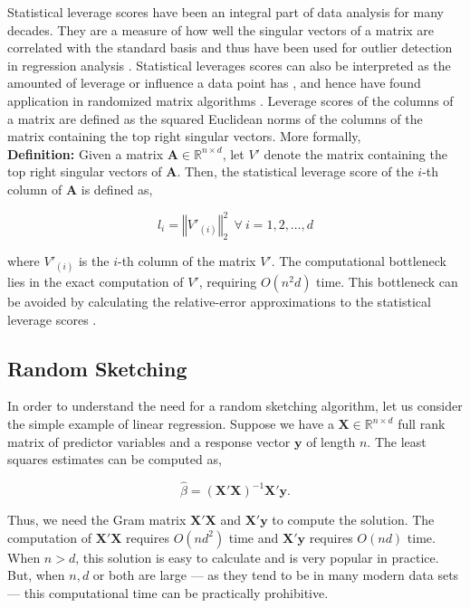 Statistical leverage scores have been an integral part of data analysis for many decades. They are a measure of how well the singular vectors of a matrix are correlated with the standard basis and thus have been used for outlier detection in regression analysis \cite{hoaglin_hat_1978, chatterjee1988}. Statistical leverages scores can also be interpreted as the amounted of leverage or influence a data point has \cite{velleman_efficient_1981}, and hence have found application in randomized matrix algorithms \cite{drineas_fast_2012, drineas_relative-error_2008, mahoney_cur_2009, drineas_faster_2011}. Leverage scores of the columns of a matrix are defined as the squared Euclidean norms of the columns of the matrix containing the top right singular vectors. More formally, \\

\textbf{Definition:} Given a matrix $\textbf{A} \in \mathds{R}^{n\times d}$, let $V'$ denote the matrix containing the top right singular vectors of $\textbf{A}$. Then, the statistical leverage score of the $i$-th column of $\textbf{A}$ is defined as,

\begin{equation}
l_i = \left\Vert V'_{(i)} \right\Vert_2^2 \ \ \forall\ i =1, 2,  \dots, d
\end{equation}

\noindent where $V'_{(i)}$ is the $i$-th column of the matrix $V'$. The computational bottleneck lies in the exact computation of $V'$, requiring $O(n^2d)$ time. This bottleneck can be avoided by calculating the relative-error approximations to the statistical leverage scores \cite{drineas_fast_2012}. \\


\subsection{Random Sketching}
\label{sec:random sketching}
In order to understand the need for a random sketching algorithm, let us consider the simple example of linear regression. Suppose we have a $ \textbf{X} \in \mathds{R}^{n \times d}$ full rank matrix of predictor variables and a response vector $\textbf{y}$ of length $n$. The least squares estimates can be computed as, 

\begin{equation*}
\hat{\beta} =  (\textbf{X}'\textbf{X})^{-1} \textbf{X}'\textbf{y}.
\end{equation*}

Thus, we need the Gram matrix $\textbf{X}'\textbf{X}$ and $\textbf{X}'\textbf{y}$ to compute the solution. The computation of $\textbf{X}'\textbf{X}$ requires $O(nd^2)$ time and $\textbf{X}'\textbf{y}$ requires $O(nd)$ time.  When $n > d$, this solution is easy to calculate and is very popular in practice. But, when $n, d$ or both are large --- as they tend to be in many modern data sets --- this computational time can be practically prohibitive. \\

